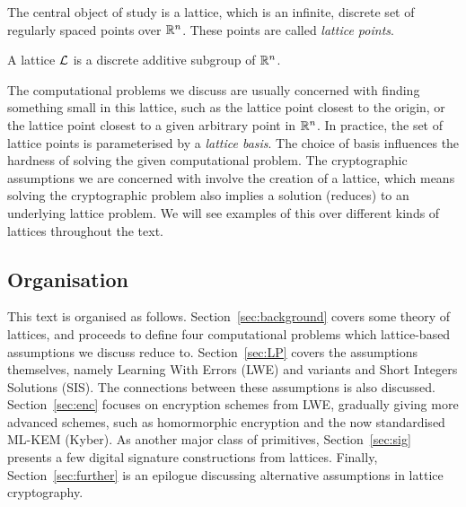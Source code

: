 The central object of study is a lattice, which is an infinite, discrete set of regularly spaced points over $\mathbb{R}^{n}$. These points are called \textit{lattice points}. 
\begin{definition}[Lattice]
    A lattice $\mathcal{L}$ is a discrete additive subgroup of $\mathbb{R}^{n}$.
\end{definition} 
The computational problems we discuss are usually concerned with finding something small in this lattice, such as the lattice point closest to the origin, or the lattice point closest to a given arbitrary point in $\mathbb{R}^{n}$. In practice, the set of lattice points is parameterised by a \textit{lattice basis}. The choice of basis influences the hardness of solving the given computational problem. The cryptographic assumptions we are concerned with involve the creation of a lattice, which means solving the cryptographic problem also implies a solution (reduces) to an underlying lattice problem. We will see examples of this over different kinds of lattices throughout the text.

\subsection{Organisation}
This text is organised as follows. Section~\ref{sec:background} covers some theory of lattices, and proceeds to define four computational problems which lattice-based assumptions we discuss reduce to. Section~\ref{sec:LP} covers the assumptions themselves, namely Learning With Errors (LWE) and variants and Short Integers Solutions (SIS). The connections between these assumptions is also discussed. Section~\ref{sec:enc} focuses on encryption schemes from LWE, gradually giving more advanced schemes, such as homormorphic encryption and the now standardised ML-KEM (Kyber). As another major class of primitives, Section~\ref{sec:sig} presents a few digital signature constructions from lattices. Finally, Section~\ref{sec:further} is an epilogue discussing alternative assumptions in lattice cryptography.